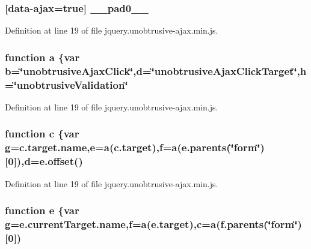 \subsubsection[{\+\_\+\+\_\+pad0\+\_\+\+\_\+}]{ \mbox{[}{\bf data}-\/{\bf ajax}=true\mbox{]} \+\_\+\+\_\+pad0\+\_\+\+\_\+}\label{jquery_8unobtrusive-ajax_8min_8js_aacc01fb2f7f20fad36cb15fd09efb750}


Definition at line 19 of file jquery.\+unobtrusive-\/ajax.\+min.\+js.

\hypertarget{jquery_8unobtrusive-ajax_8min_8js_aa4d4888597588a84fd5b1184d00c91f3}{}
\subsubsection[{a}]{\setlength{\rightskip}{0pt plus 5cm}function a \{var {\bf b}=\char`\"{}unobtrusive\+Ajax\+Click\char`\"{},d=\char`\"{}unobtrusive\+Ajax\+Click\+Target\char`\"{},h=\char`\"{}unobtrusive\+Validation\char`\"{}}\label{jquery_8unobtrusive-ajax_8min_8js_aa4d4888597588a84fd5b1184d00c91f3}


Definition at line 19 of file jquery.\+unobtrusive-\/ajax.\+min.\+js.

\hypertarget{jquery_8unobtrusive-ajax_8min_8js_ad9d1ac02e33c4aed62ad517a7cb8b3fb}{}
\subsubsection[{c}]{\setlength{\rightskip}{0pt plus 5cm}function c \{var {\bf g}=c.\+target.\+name,{\bf e}={\bf a}(c.\+target),{\bf f}={\bf a}(e.\+parents(\char`\"{}form\char`\"{})\mbox{[}0\mbox{]}),d={\bf e.\+offset}()}\label{jquery_8unobtrusive-ajax_8min_8js_ad9d1ac02e33c4aed62ad517a7cb8b3fb}


Definition at line 19 of file jquery.\+unobtrusive-\/ajax.\+min.\+js.

\hypertarget{jquery_8unobtrusive-ajax_8min_8js_a2c038346d47955cbe2cb91e338edd7e1}{}
\subsubsection[{e}]{\setlength{\rightskip}{0pt plus 5cm}function e \{var {\bf g}=e.\+current\+Target.\+name,{\bf f}={\bf a}(e.\+target),{\bf c}={\bf a}(f.\+parents(\char`\"{}form\char`\"{})\mbox{[}0\mbox{]})}\label{jquery_8unobtrusive-ajax_8min_8js_a2c038346d47955cbe2cb91e338edd7e1}


